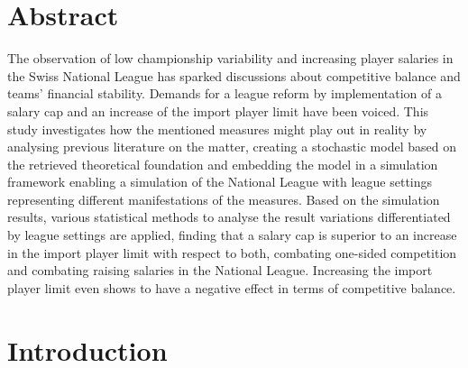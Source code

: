 \documentclass[12pt, a4paper]{article}
\begin{document}


\section*{\centering Abstract}
The observation of low championship variability and increasing player salaries in the Swiss National League has sparked    discussions about competitive balance and teams' financial stability. Demands for a league reform by implementation of a salary cap and an increase of the import player limit have been voiced. This study investigates how the mentioned measures might play out in reality by analysing previous literature on the matter, creating a stochastic model based on the retrieved theoretical foundation and embedding the model in a simulation framework enabling a simulation of the National League with league settings representing different manifestations of the measures. Based on the simulation results, various statistical methods to analyse the result variations differentiated by league settings are applied, finding that a salary cap is superior to an increase in the import player limit with respect to both, combating one-sided competition and combating raising salaries in the National League. Increasing the import player limit even shows to have a negative effect in terms of competitive balance. 

\setcounter{page}{2}  %
\newpage

\tableofcontents  %

\listoffigures
\listoftables
\listofalgorithms
\newpage

\titlespacing*{\section}{0pt}{0pt}{-0.5cm}
\titlespacing*{\subsection}{0pt}{0pt}{-0.5cm}
\titlespacing*{\subsubsection}{0pt}{0pt}{-0.5cm}

\section{Introduction}
\end{document}
